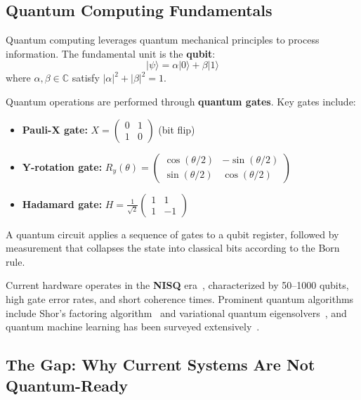 ﻿\documentclass[12pt,a4paper]{article}
\begin{document}
\subsection{Quantum Computing Fundamentals}

Quantum computing leverages quantum mechanical principles to process information. The fundamental unit is the \textbf{qubit}:
\begin{equation}
    |\psi\rangle = \alpha|0\rangle + \beta|1\rangle
\end{equation}
where $\alpha, \beta \in \mathbb{C}$ satisfy $|\alpha|^2 + |\beta|^2 = 1$.

Quantum operations are performed through \textbf{quantum gates}. Key gates include:
\begin{itemize}
    \item \textbf{Pauli-X gate:} $X = \begin{pmatrix} 0 & 1 \\ 1 & 0 \end{pmatrix}$ (bit flip)
    \item \textbf{Y-rotation gate:} $R_y(\theta) = \begin{pmatrix} \cos(\theta/2) & -\sin(\theta/2) \\ \sin(\theta/2) & \cos(\theta/2) \end{pmatrix}$
    \item \textbf{Hadamard gate:} $H = \frac{1}{\sqrt{2}}\begin{pmatrix} 1 & 1 \\ 1 & -1 \end{pmatrix}$
\end{itemize}

A quantum circuit applies a sequence of gates to a qubit register, followed by measurement that collapses the state into classical bits according to the Born rule.

Current hardware operates in the \textbf{NISQ} era~\cite{preskill2018}, characterized by 50--1000 qubits, high gate error rates, and short coherence times. Prominent quantum algorithms include Shor's factoring algorithm~\cite{shor1994} and variational quantum eigensolvers~\cite{kandala2017}, and quantum machine learning has been surveyed extensively~\cite{biamonte2017,cerezo2021}.

\subsection{The Gap: Why Current Systems Are Not Quantum-Ready}
\end{document}
